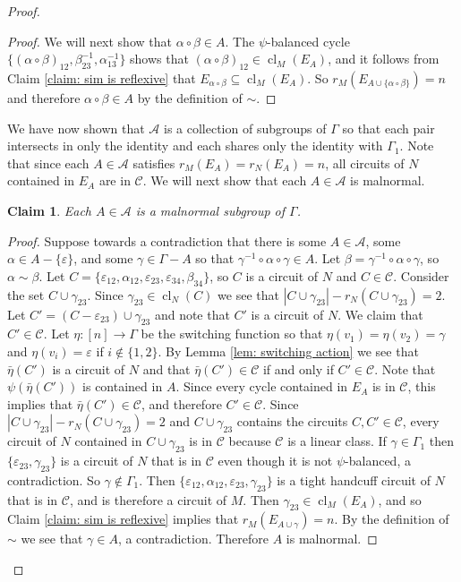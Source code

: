 \documentclass[12pt]{article}
\newtheorem{claim}{Claim}[theorem]
\theoremstyle{definition}
\newcommand{\cA}{\mathcal{A}}
\newcommand{\cC}{\mathcal{C}}
\newcommand{\ep}{\varepsilon}
\DeclareMathOperator{\cl}{cl}
\begin{document}
\begin{proof}
\begin{proof}
We will next show that $\alpha \circ \beta \in A$.
The $\psi$-balanced cycle $\{(\alpha \circ \beta)_{12}, \beta^{-1}_{23}, \alpha^{-1}_{13}\}$ shows that $(\alpha \circ \beta)_{12} \in \cl_M(E_{A})$, and it follows from Claim \ref{claim: sim is reflexive} that $E_{\alpha \circ \beta} \subseteq \cl_M(E_{A})$.
So $r_M(E_{A \cup \{\alpha \circ \beta\}}) = n$ and therefore $\alpha \circ \beta \in A$ by the definition of $\sim$.
\end{proof}


We have now shown that $\cA$ is a collection of subgroups of $\Gamma$ so that each pair intersects in only the identity and each shares only the identity with $\Gamma_1$.
Note that since each $A \in \cA$ satisfies $r_M(E_A) = r_N(E_A) = n$, all circuits of $N$ contained in $E_A$ are in $\cC$.
We will next show that each $A \in \cA$ is malnormal.

\begin{claim} \label{claim: malnormal}
Each $A \in \cA$ is a malnormal subgroup of $\Gamma$.
\end{claim}
\begin{proof}
Suppose towards a contradiction that there is some $A \in \cA$, some $\alpha \in A - \{\ep\}$, and some $\gamma \in \Gamma - A$ so that $\gamma^{-1} \circ \alpha \circ \gamma \in A$.
Let $\beta = \gamma^{-1} \circ \alpha \circ \gamma$, so $\alpha \sim \beta$.
Let $C = \{\ep_{12}, \alpha_{12}, \ep_{23}, \ep_{34}, \beta_{34}\}$, so $C$ is a circuit of $N$ and $C \in \cC$.
Consider the set $C \cup \gamma_{23}$.
Since $\gamma_{23} \in \cl_N(C)$ we see that $|C \cup \gamma_{23}| - r_N(C \cup \gamma_{23}) = 2$.
Let $C' = (C - \ep_{23}) \cup \gamma_{23}$ and note that $C'$ is a circuit of $N$.
We claim that $C' \in \cC$.
Let $\eta \colon [n] \to \Gamma$ be the switching function so that $\eta(v_1) = \eta(v_2) = \gamma$ and $\eta(v_i) = \ep$ if $i \notin \{1,2\}$.
By Lemma \ref{lem: switching action} we see that $\bar\eta(C')$ is a circuit of $N$ and that $\bar\eta(C') \in \cC$ if and only if $C' \in \cC$.
Note that $\psi(\bar\eta(C'))$ is contained in $A$.
Since every cycle contained in $E_A$ is in $\cC$, this implies that $\bar\eta(C') \in \cC$, and therefore $C' \in \cC$.
Since $|C \cup \gamma_{23}| - r_N(C \cup \gamma_{23}) = 2$ and $C \cup \gamma_{23}$ contains the circuits $C, C' \in \cC$, every circuit of $N$ contained in $C \cup \gamma_{23}$ is in $\cC$ because $\cC$ is a linear class.
If $\gamma \in \Gamma_1$ then $\{\ep_{23}, \gamma_{23}\}$ is a circuit of $N$ that is in $\cC$ even though it is not $\psi$-balanced, a contradiction.
So $\gamma \notin \Gamma_1$.
Then $\{\ep_{12}, \alpha_{12}, \ep_{23}, \gamma_{23}\}$ is a tight handcuff circuit of $N$ that is in $\cC$, and is therefore a circuit of $M$.
Then $\gamma_{23} \in \cl_M(E_A)$, and so Claim \ref{claim: sim is reflexive} implies that $r_M(E_{A \cup \gamma}) = n$.
By the definition of $\sim$ we see that $\gamma \in A$, a contradiction.
Therefore $A$ is malnormal.
\end{proof}


\end{proof}
\end{document}

